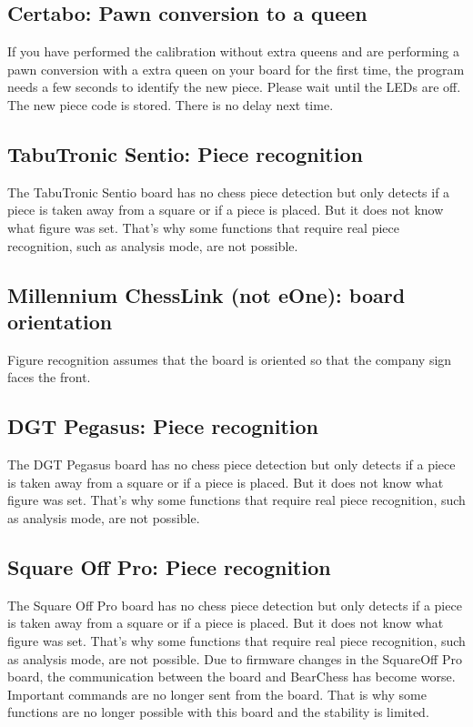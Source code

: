\documentclass[11pt,a4paper]{article}
\begin{document}
\subsection{Certabo: Pawn conversion to a queen}
If you have performed the calibration without extra queens and are performing a pawn conversion with a extra queen on your board for the first time, the program needs a few seconds to identify the new piece. Please wait until the LEDs are off. The new piece code is stored. There is no delay next time.

\subsection{TabuTronic Sentio: Piece recognition}
The TabuTronic Sentio board has no chess piece detection but only detects if a piece is taken away from a square or if a piece is placed. But it does not know what figure was set. That's why some functions that require real piece recognition, such as analysis mode, are not possible.

\subsection{Millennium ChessLink (not eOne): board orientation}
Figure recognition assumes that the board is oriented so that the company sign faces the front.

\subsection{DGT Pegasus: Piece recognition}
The DGT Pegasus board has no chess piece detection but only detects if a piece is taken away from a square or if a piece is placed. But it does not know what figure was set. That's why some functions that require real piece recognition, such as analysis mode, are not possible.

\subsection{Square Off Pro: Piece recognition}
The Square Off Pro board has no chess piece detection but only detects if a piece is taken away from a square or if a piece is placed. But it does not know what figure was set. That's why some functions that require real piece recognition, such as analysis mode, are not possible. Due to firmware changes in the SquareOff Pro board, the communication between the board and BearChess has become worse. Important commands are no longer sent from the board.
That is why some functions are no longer possible with this board and the stability is limited.
\end{document}
